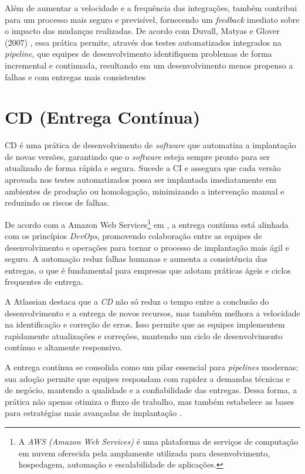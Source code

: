 Além de aumentar a velocidade e a frequência das integrações, também contribui para um processo mais seguro e previsível, fornecendo um \textit{feedback} imediato sobre o impacto das mudanças realizadas. De acordo com Duvall, Matyas e Glover (2007) \cite{Duvall2007}, essa prática permite, através dos testes automatizados integrados na \textit{pipeline}, que equipes de desenvolvimento identifiquem problemas de forma incremental e continuada, resultando em um desenvolvimento menos propenso a falhas e com entregas mais consistentes \cite{Duvall2007}

\section{CD (Entrega Contínua)}

CD é uma prática de desenvolvimento de \textit{software} que automatiza a implantação de novas versões, garantindo que o \textit{software} esteja sempre pronto para ser atualizado de forma rápida e segura. Sucede a CI e assegura que cada versão aprovada nos testes automatizados possa ser implantada imediatamente em ambientes de produção ou homologação, minimizando a intervenção manual e reduzindo os riscos de falhas.

De acordo com a Amazon Web Services\footnote{A \textit{AWS (Amazon Web Services)} é uma plataforma de serviços de computação em nuvem oferecida pela amplamente utilizada para desenvolvimento, hospedagem, automação e escalabilidade de aplicações.} em \cite{AWSCD2024}, a entrega contínua está alinhada com os princípios \textit{DevOps}, promovendo colaboração entre as equipes de desenvolvimento e operações para tornar o processo de implantação mais ágil e seguro. A automação reduz falhas humanas e aumenta a consistência das entregas, o que é fundamental para empresas que adotam práticas ágeis e ciclos frequentes de entrega.

A Atlassian \cite{Atlassian2025} destaca que a \textit{CD} não só reduz o tempo entre a conclusão do desenvolvimento e a entrega de novos recursos, mas também melhora a velocidade na identificação e correção de erros. Isso permite que as equipes implementem rapidamente atualizações e correções, mantendo um ciclo de desenvolvimento contínuo e altamente responsivo.

A entrega contínua se consolida como um pilar essencial para \textit{pipelines} modernas; sua adoção permite que equipes respondam com rapidez a demandas técnicas e de negócio, mantendo a qualidade e a confiabilidade das entregas. Dessa forma, a prática não apenas otimiza o fluxo de trabalho, mas também estabelece as bases para estratégias mais avançadas de implantação \cite{Humble2010}.

